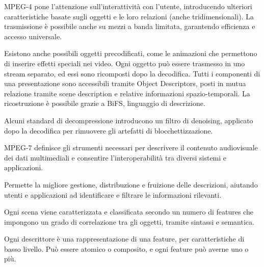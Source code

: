 MPEG-4 pone l'attenzione sull'interattività con l'utente, introducendo ulteriori caratteristiche basate sugli oggetti e le loro relazioni (anche tridimensionali). La trasmissione è possibile anche su mezzi a banda limitata, garantendo efficienza e accesso universale.

Esistono anche possibili oggetti precodificati, come le animazioni che permettono di inserire effetti speciali nei video. Ogni oggetto può essere trasmesso in uno stream separato, ed essi sono ricomposti dopo la decodifica.
Tutti i componenti di una presentazione sono accessibili tramite Object Descriptors, posti in mutua relazione tramite scene description e relative informazioni spazio-temporali. La ricostruzione è possibile grazie a BiFS, linguaggio di descrizione.

Alcuni standard di decompressione introducono un filtro di denoising, applicato dopo la decodifica per rimuovere gli artefatti di blocchettizzazione. 

MPEG-7 definisce gli strumenti necessari per descrivere il contenuto audiovisuale dei dati multimediali e consentire l'interoperabilità tra diversi sistemi e applicazioni. 

Permette la migliore gestione, distribuzione e fruizione delle descrizioni, aiutando utenti e applicazioni ad identificare e filtrare le informazioni rilevanti.

Ogni scena viene caratterizzata e classificata secondo un numero di features che impongono un grado di correlazione tra gli oggetti, tramite sintassi e semantica.

Ogni descrittore è una rappresentazione di una feature, per caratteristiche di basso livello. Può essere atomico o composito, e ogni feature può averne uno o più.
